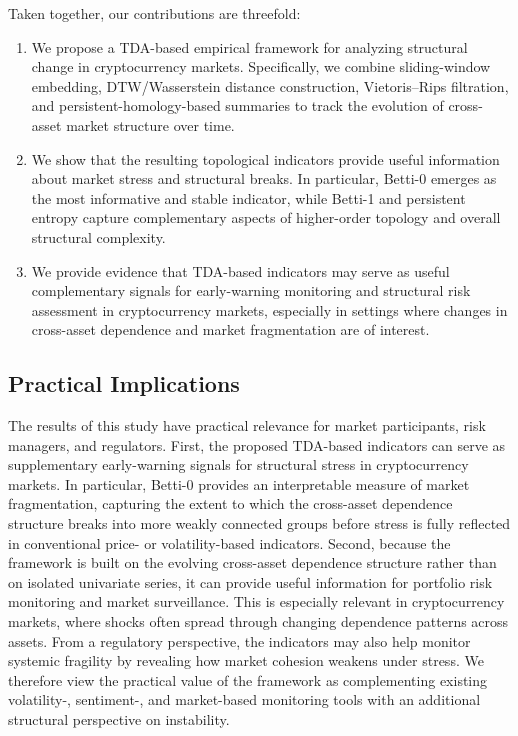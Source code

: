 \documentclass[11pt,reqno]{amsart}
\numberwithin{equation}{section} %
\begin{document}
Taken together, our contributions are threefold:
\begin{enumerate}
  \item We propose a TDA-based empirical framework for analyzing structural change in cryptocurrency markets. Specifically, we combine sliding-window embedding, DTW/Wasserstein distance construction, Vietoris--Rips filtration, and persistent-homology-based summaries to track the evolution of cross-asset market structure over time.
  
  \item We show that the resulting topological indicators provide useful information about market stress and structural breaks. In particular, Betti-0 emerges as the most informative and stable indicator, while Betti-1 and persistent entropy capture complementary aspects of higher-order topology and overall structural complexity.
  
  \item We provide evidence that TDA-based indicators may serve as useful complementary signals for early-warning monitoring and structural risk assessment in cryptocurrency markets, especially in settings where changes in cross-asset dependence and market fragmentation are of interest.
\end{enumerate}

\subsection{Practical Implications}
The results of this study have practical relevance for market participants, risk managers, and regulators. 
First, the proposed TDA-based indicators can serve as supplementary early-warning signals for structural stress in cryptocurrency markets. 
In particular, Betti-0 provides an interpretable measure of market fragmentation, capturing the extent to which the cross-asset dependence structure breaks into more weakly connected groups before stress is fully reflected in conventional price- or volatility-based indicators.
Second, because the framework is built on the evolving cross-asset dependence structure rather than on isolated univariate series, it can provide useful information for portfolio risk monitoring and market surveillance. 
This is especially relevant in cryptocurrency markets, where shocks often spread through changing dependence patterns across assets. 
From a regulatory perspective, the indicators may also help monitor systemic fragility by revealing how market cohesion weakens under stress. 
We therefore view the practical value of the framework as complementing existing volatility-, sentiment-, and market-based monitoring tools with an additional structural perspective on instability.
\end{document}
